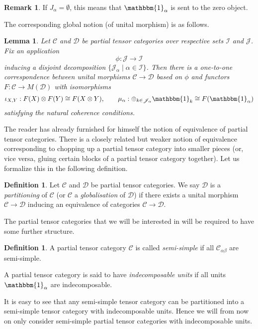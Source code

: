 \documentclass[11pt]{article}
\newcommand{\CatC}{\mathcal{C}}
\newcommand{\CatD}{\mathcal{D}}
\newcommand{\CatCC}{\mathscr{C}}
\newcommand{\CatDD}{\mathscr{D}}
\newcommand{\Unitb}{\mathbbm{1}}
\newtheorem{Lem}[Theorem]{Lemma}
\theoremstyle{definition}
\newtheorem{Def}[Theorem]{Definition}
\newtheorem{Rem}[Theorem]{Remark}
\numberwithin{equation}{section}
\begin{document}
\begin{Rem} If $J_{\alpha}=\emptyset$, this means that $\Unitb_{\alpha}$ is sent to the zero object.
\end{Rem} 

The corresponding global notion (of unital morphism) is as follows.

\begin{Lem} Let $\CatCC$ and $\CatDD$ be partial tensor categories over respective sets $\mathscr{I}$ and $\mathscr{J}$. Fix an application \[\phi: \mathscr{J}\rightarrow \mathscr{I}\] inducing a disjoint decomposition $\{\mathscr{J}_\alpha\mid \alpha\in \mathscr{I}\}$. Then there is a one-to-one correspondence between unital morphisms $\CatCC\rightarrow \CatDD$ based on $\phi$ and functors $F:\CatC \rightarrow M(\CatD)$ with isomorphisms \[\iota_{X,Y}:F(X)\otimes F(Y)\cong F(X\otimes Y),\qquad \mu_\alpha:\oplus_{k\in \mathscr{J}_\alpha} \Unitb_k \cong F(\Unitb_\alpha)\] satisfying the natural coherence conditions. 
\end{Lem} 

The reader has already furnished for himself the notion of equivalence of partial tensor categories. There is a closely related but weaker notion of equivalence corresponding to chopping up a partial tensor category into smaller pieces (or, vice versa, gluing certain blocks of a partial tensor category together). Let us formalize this in the following definition.

\begin{Def} Let $\CatCC$ and $\CatDD$ be partial tensor categories. We say $\CatDD$ is a \emph{partitioning} of $\CatCC$ (or $\CatCC$ a \emph{globalisation} of $\CatDD$) if there exists a unital morphism $\CatCC\rightarrow \CatDD$ inducing an equivalence of categories $\CatC\rightarrow \CatD$.
\end{Def}

The partial tensor categories that we will be interested in will be required to have some further structure. 

\begin{Def} A partial tensor category $\CatCC$ is called \emph{semi-simple} if all $\CatC_{\alpha\beta}$ are semi-simple. 

A partial tensor category is said to have \emph{indecomposable units} if all units $\Unitb_\alpha$ are indecomposable. 
\end{Def}

It is easy to see that any semi-simple tensor category can be partitioned into a semi-simple tensor category with indecomposable units.  Hence we will from now on only consider semi-simple partial tensor categories with indecomposable units.
 
\end{document}
